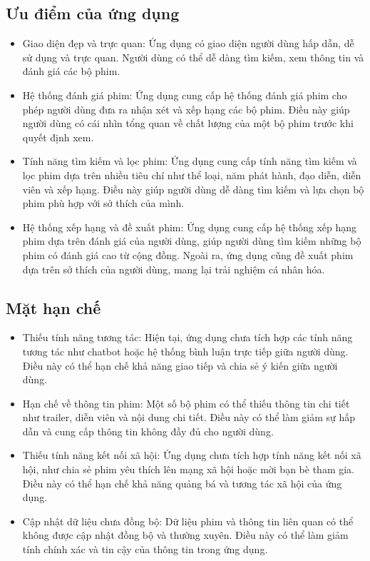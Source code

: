 \documentclass[12pt]{article}
\begin{document}
\subsection{Ưu điểm của ứng dụng}
\begin{itemize}
    \item Giao diện đẹp và trực quan: Ứng dụng có giao diện người dùng hấp dẫn, dễ sử dụng và trực quan. Người dùng có thể dễ dàng tìm kiếm, xem thông tin và đánh giá các bộ phim.

    \item Hệ thống đánh giá phim: Ứng dụng cung cấp hệ thống đánh giá phim cho phép người dùng đưa ra nhận xét và xếp hạng các bộ phim. Điều này giúp người dùng có cái nhìn tổng quan về chất lượng của một bộ phim trước khi quyết định xem.

    \item Tính năng tìm kiếm và lọc phim: Ứng dụng cung cấp tính năng tìm kiếm và lọc phim dựa trên nhiều tiêu chí như thể loại, năm phát hành, đạo diễn, diễn viên và xếp hạng. Điều này giúp người dùng dễ dàng tìm kiếm và lựa chọn bộ phim phù hợp với sở thích của mình.

    \item Hệ thống xếp hạng và đề xuất phim: Ứng dụng cung cấp hệ thống xếp hạng phim dựa trên đánh giá của người dùng, giúp người dùng tìm kiếm những bộ phim có đánh giá cao từ cộng đồng. Ngoài ra, ứng dụng cũng đề xuất phim dựa trên sở thích của người dùng, mang lại trải nghiệm cá nhân hóa.
\end{itemize}
\subsection{Mặt hạn chế}
\begin{itemize}
    \item Thiếu tính năng tương tác: Hiện tại, ứng dụng chưa tích hợp các tính năng tương tác như chatbot hoặc hệ thống bình luận trực tiếp giữa người dùng. Điều này có thể hạn chế khả năng giao tiếp và chia sẻ ý kiến giữa người dùng.

    \item Hạn chế về thông tin phim: Một số bộ phim có thể thiếu thông tin chi tiết như trailer, diễn viên và nội dung chi tiết. Điều này có thể làm giảm sự hấp dẫn và cung cấp thông tin không đầy đủ cho người dùng.

    \item Thiếu tính năng kết nối xã hội: Ứng dụng chưa tích hợp tính năng kết nối xã hội, như chia sẻ phim yêu thích lên mạng xã hội hoặc mời bạn bè tham gia. Điều này có thể hạn chế khả năng quảng bá và tương tác xã hội của ứng dụng.

    \item Cập nhật dữ liệu chưa đồng bộ: Dữ liệu phim và thông tin liên quan có thể không được cập nhật đồng bộ và thường xuyên. Điều này có thể làm giảm tính chính xác và tin cậy của thông tin trong ứng dụng.
\end{itemize}
\end{document}
